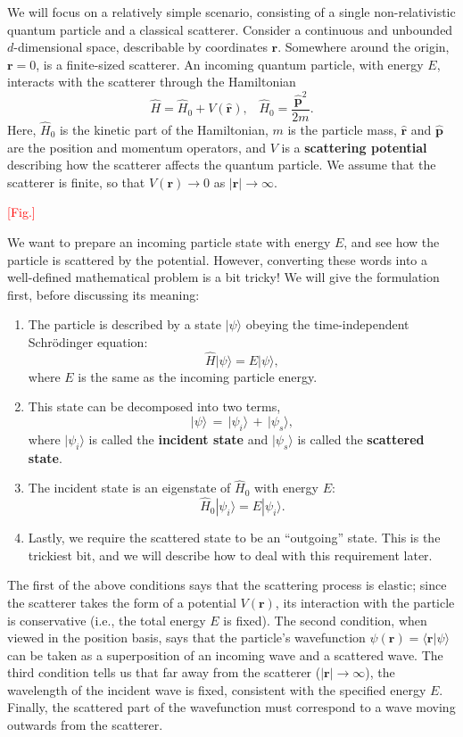 \documentclass[pra,11pt]{revtex4}
\begin{document}
We will focus on a relatively simple scenario, consisting of a single
non-relativistic quantum particle and a classical scatterer.  Consider
a continuous and unbounded $d$-dimensional space, describable by
coordinates $\mathbf{r}$.  Somewhere around the origin, $\mathbf{r} =
0$, is a finite-sized scatterer.  An incoming quantum particle, with
energy $E$, interacts with the scatterer through the Hamiltonian
$$\hat{H} = \hat{H}_0 + V(\hat{\mathbf{r}}), \;\;\; \hat{H}_0 = \frac{\hat{\mathbf{p}}^2}{2m}.$$
Here, $\hat{H}_0$ is the kinetic part of the Hamiltonian, $m$ is the
particle mass, $\hat{\mathbf{r}}$ and $\hat{\mathbf{p}}$ are the
position and momentum operators, and $V$ is a \textbf{scattering
  potential} describing how the scatterer affects the quantum
particle.  We assume that the scatterer is finite, so that
$V(\mathbf{r}) \rightarrow 0$ as $|\mathbf{r}| \rightarrow \infty$.

\textcolor{red}{[Fig.]}

We want to prepare an incoming particle state with energy $E$, and see
how the particle is scattered by the potential.  However, converting
these words into a well-defined mathematical problem is a bit tricky!
We will give the formulation first, before discussing its meaning:
\begin{enumerate}
\item 
The particle is described by a state $|\psi\rangle$ obeying the
time-independent Schr\"odinger equation:
$$\hat{H} |\psi\rangle = E |\psi\rangle,$$
where $E$ is the same as the incoming particle energy.  

\item
This state can be decomposed into two terms,
$$|\psi\rangle \,=\, |\psi_i\rangle \,+\, |\psi_s\rangle,$$
where $|\psi_i\rangle$ is called the \textbf{incident state} and
$|\psi_s\rangle$ is called the \textbf{scattered state}.  

\item
The incident state is an eigenstate of $\hat{H}_0$ with energy $E$:
$$\hat{H}_0 |\psi_i\rangle = E |\psi_i\rangle.$$

\item
Lastly, we require the scattered state to be an ``outgoing'' state.
This is the trickiest bit, and we will describe how to deal with this
requirement later.
\end{enumerate}
The first of the above conditions says that the scattering process is
elastic; since the scatterer takes the form of a potential
$V(\mathbf{r})$, its interaction with the particle is conservative
(i.e., the total energy $E$ is fixed).  The second condition, when
viewed in the position basis, says that the particle's wavefunction
$\psi(\mathbf{r}) = \langle \mathbf{r} |\psi\rangle$ can be taken as a
superposition of an incoming wave and a scattered wave.  The third
condition tells us that far away from the scatterer
($|\mathbf{r}|\rightarrow \infty$), the wavelength of the incident
wave is fixed, consistent with the specified energy $E$.  Finally, the
scattered part of the wavefunction must correspond to a wave moving
outwards from the scatterer.
\end{document}
